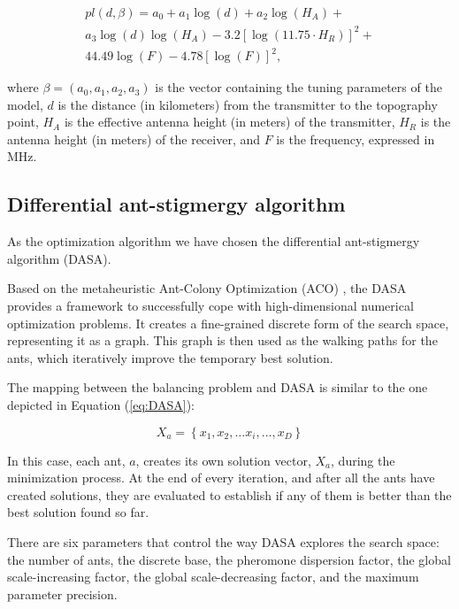 \begin{multline}
pl(d,\beta)=a_{0}+a_{1}\log(d)+a_{2}\log(H_{A})+\\
a_{3}\log(d)\log(H_{A})-3.2\left[\log(11.75\cdot H_{R})\right]^{2}+\\
44.49\log(F)-4.78\left[\log(F)\right]^{2},\label{eq:ericsson9999}
\end{multline}


where $\beta=(a_{0},a_{1},a_{2},a_{3})$ is the vector containing
the tuning parameters of the model, $d$ is the distance (in kilometers)
from the transmitter to the topography point, $H_{A}$ is the effective
antenna height (in meters) of the transmitter, $H_{R}$ is the antenna
height (in meters) of the receiver, and $F$ is the frequency, expressed
in MHz.


\subsection{Differential ant-stigmergy algorithm}

As the optimization algorithm we have chosen the differential ant-stigmergy
algorithm (DASA).

Based on the metaheuristic Ant-Colony Optimization (ACO) \cite{dorigo2006ant_colony_optimization},
the DASA \cite{korosec2010_DASA} provides a framework to successfully
cope with high-dimensional numerical optimization problems. It creates
a fine-grained discrete form of the search space, representing it
as a graph. This graph is then used as the walking paths for the ants,
which iteratively improve the temporary best solution.

The mapping between the balancing problem and DASA is similar to the
one depicted in Equation (\ref{eq:DASA}):

\begin{equation}
X_{a}=\left\{ x_{1},x_{2},\ldots x_{i},\ldots,x_{D}\right\} \label{eq:DASA}
\end{equation}


In this case, each ant, $a$, creates its own solution vector, $X_{a}$,
during the minimization process. At the end of every iteration, and
after all the ants have created solutions, they are evaluated to establish
if any of them is better than the best solution found so far.

There are six parameters that control the way DASA explores the search
space: the number of ants, the discrete base, the pheromone dispersion
factor, the global scale-increasing factor, the global scale-decreasing
factor, and the maximum parameter precision.

